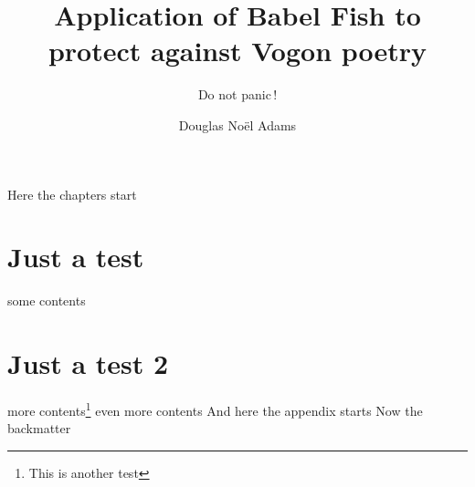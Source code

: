\documentclass[oneside]{JenThesis}
\author{Douglas Noël Adams}
\title{Application of Babel Fish to protect against Vogon poetry}
\subtitle{Do not panic\,!}
\begin{document}
	
	\frontmatter
		\autofrontmatter
	\mainmatter
		Here the chapters start
		\chapter{Just a test}
			some contents
		\chapter{Just a test 2}
			more contents\footnote{This is another test}
			even more contents
	\appendix
		And here the appendix starts
	\backmatter
		Now the backmatter
		
\end{document}
